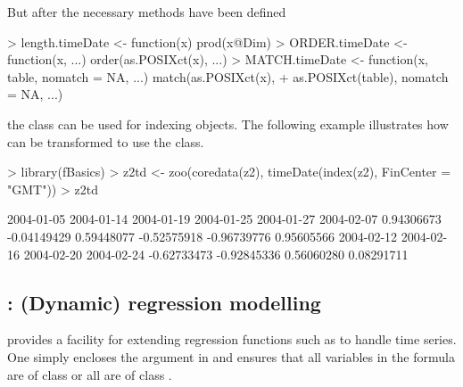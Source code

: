 \documentclass{Z}
\begin{document}
But after the necessary methods have been defined
\begin{Schunk}
\begin{Sinput}
> length.timeDate <- function(x) prod(x@Dim)
> ORDER.timeDate <- function(x, ...) order(as.POSIXct(x), ...)
> MATCH.timeDate <- function(x, table, nomatch = NA, ...) match(as.POSIXct(x), 
+     as.POSIXct(table), nomatch = NA, ...)
\end{Sinput}
\end{Schunk}
the class  can be used for indexing  objects.
The following example illustrates how  can be transformed
to use the  class.
\begin{Schunk}
\begin{Sinput}
> library(fBasics)
> z2td <- zoo(coredata(z2), timeDate(index(z2), FinCenter = "GMT"))
> z2td
\end{Sinput}
\begin{Soutput}
 2004-01-05  2004-01-14  2004-01-19  2004-01-25  2004-01-27  2004-02-07 
 0.94306673 -0.04149429  0.59448077 -0.52575918 -0.96739776  0.95605566 
 2004-02-12  2004-02-16  2004-02-20  2004-02-24 
-0.62733473 -0.92845336  0.56060280  0.08291711 
\end{Soutput}
\end{Schunk}

\subsection[stats: (Dynamic) regression modelling]{: (Dynamic) regression modelling}
\label{sec:stats}

 provides a facility for extending regression functions such
as  to handle time series.  One simply encloses the 
argument in  and ensures that all variables in
the formula are of class  or all are of class .
\end{document}
